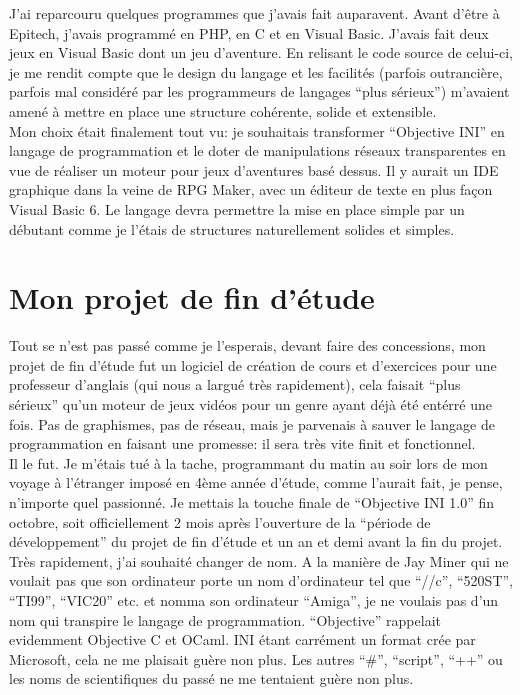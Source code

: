 \documentclass[a5paper, 12pt]{book}
\begin{document}
J'ai reparcouru quelques programmes que j'avais fait auparavent.
Avant d'être à Epitech, j'avais programmé en PHP, en C et
en Visual Basic. J'avais fait deux jeux en Visual Basic dont
un jeu d'aventure. En relisant le code source de celui-ci, je
me rendit compte que le design du langage et les facilités
(parfois outrancière, parfois mal considéré par les programmeurs
de langages ``plus sérieux'') m'avaient amené à mettre en
place une structure cohérente, solide et extensible.\\

Mon choix était finalement tout vu: je souhaitais transformer
``Objective INI'' en langage de programmation et le doter
de manipulations réseaux transparentes en vue de réaliser
un moteur pour jeux d'aventures basé dessus. Il y aurait un
IDE graphique dans la veine de RPG Maker, avec un éditeur
de texte en plus façon Visual Basic 6. Le langage devra
permettre la mise en place simple par un débutant comme
je l'étais de structures naturellement solides et simples.\\

\newpage

\section{Mon projet de fin d'étude}

Tout se n'est pas passé comme je l'esperais, devant faire
des concessions, mon projet de fin d'étude fut un logiciel
de création de cours et d'exercices pour une professeur
d'anglais (qui nous a largué très rapidement), cela faisait
``plus sérieux'' qu'un moteur de jeux vidéos pour un genre
ayant déjà été entérré une fois. Pas de graphismes, pas
de réseau, mais je parvenais à sauver le langage de programmation
en faisant une promesse: il sera très vite finit et fonctionnel.\\

Il le fut. Je m'étais tué à la tache, programmant du matin au soir
lors de mon voyage à l'étranger imposé en 4ème année d'étude,
comme l'aurait fait, je pense, n'importe quel passionné.
Je mettais la touche finale de ``Objective INI 1.0''
fin octobre, soit officiellement 2 mois après l'ouverture
de la ``période de développement'' du projet de fin d'étude et
un an et demi avant la fin du projet. Très rapidement, j'ai
souhaité changer de nom. A la manière de Jay Miner qui ne voulait
pas que son ordinateur porte un nom d'ordinateur tel que ``//c'',
``520ST'', ``TI99'', ``VIC20'' etc. et nomma son ordinateur
``Amiga'', je ne voulais pas d'un nom qui transpire le langage
de programmation. ``Objective'' rappelait evidemment Objective C
et OCaml. INI étant carrément un format crée par Microsoft, cela
ne me plaisait guère non plus. Les autres ``\#'', ``script'', ``++''
ou les noms de scientifiques du passé ne me tentaient guère non
plus.\\
\end{document}
